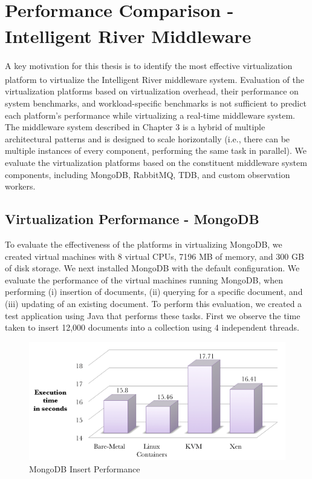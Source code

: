 \section{Performance Comparison - Intelligent River\textsuperscript{\textregistered} Middleware}

A key motivation for this thesis is to identify the most effective virtualization platform to virtualize the Intelligent River\textsuperscript{\textregistered} middleware system. Evaluation of the virtualization platforms based on virtualization overhead, their performance on system benchmarks, and workload-specific benchmarks is not sufficient to predict each platform's performance while virtualizing a real-time middleware system. The middleware system described in Chapter 3 is a hybrid of multiple architectural patterns and is designed to scale horizontally (i.e., there can be multiple instances of every component, performing the same task in parallel). We evaluate the virtualization platforms based on the constituent middleware system components, including MongoDB, RabbitMQ, TDB, and custom observation workers.

\subsection{Virtualization Performance - MongoDB}


To evaluate the effectiveness of the platforms in virtualizing MongoDB, we created virtual machines with 8 virtual CPUs, 7196 MB of memory, and 300 GB of disk storage. We next installed MongoDB with the default configuration. We evaluate the performance of the virtual machines running MongoDB, when performing (i) insertion of documents, (ii) querying for a specific document, and (iii) updating of an existing document. To perform this evaluation, we created a test application using Java that performs these tasks. First we observe the time taken to insert 12,000 documents into a collection using 4 independent threads.


\begin{figure}[H]
\centering
\includegraphics[width=150mm]{mongoinsert.png}
\caption{MongoDB Insert Performance}
\label{fig:mongoinsert}
\end{figure}

